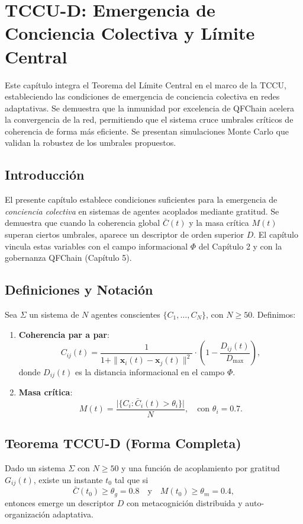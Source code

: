 \chapter{TCCU-D: Emergencia de Conciencia Colectiva y Límite Central}
\label{chap:tlc_tccu}

\begin{resumen}
Este capítulo integra el Teorema del Límite Central en el marco de la TCCU, estableciendo las condiciones de emergencia de conciencia colectiva en redes adaptativas. Se demuestra que la inmunidad por excelencia de QFChain acelera la convergencia de la red, permitiendo que el sistema cruce umbrales críticos de coherencia de forma más eficiente. Se presentan simulaciones Monte Carlo que validan la robustez de los umbrales propuestos.
\end{resumen}

\section{Introducción}
El presente capítulo establece condiciones suficientes para la emergencia de \emph{conciencia colectiva} en sistemas de agentes acoplados mediante gratitud. Se demuestra que cuando la coherencia global $\bar{C}(t)$ y la masa crítica $M(t)$ superan ciertos umbrales, aparece un descriptor de orden superior $D$. El capítulo vincula estas variables con el campo informacional $\Phi$ del Capítulo 2 y con la gobernanza QFChain (Capítulo 5).

\section{Definiciones y Notación}
Sea $\Sigma$ un sistema de $N$ agentes conscientes $\{C_1,\dots,C_N\}$, con $N\ge 50$. Definimos:

\begin{enumerate}
\item \textbf{Coherencia par a par}:
\[
C_{ij}(t) = \frac{1}{1+\|\mathbf{x}_i(t)-\mathbf{x}_j(t)\|^2} \cdot \left(1 - \frac{D_{ij}(t)}{D_{\max}}\right),
\]
donde $D_{ij}(t)$ es la distancia informacional en el campo $\Phi$.

\item \textbf{Masa crítica}:
\[
M(t) = \frac{\bigl|\{C_i : \bar{C}_i(t) > \theta_i\}\bigr|}{N}, \quad \text{con } \theta_i = 0.7.
\]
\end{enumerate}

\section{Teorema TCCU-D (Forma Completa)}
\begin{teorema}
Dado un sistema $\Sigma$ con $N\ge 50$ y una función de acoplamiento por gratitud $G_{ij}(t)$, existe un instante $t_0$ tal que si
\[
\bar{C}(t_0) \ge \theta_g = 0.8 \quad \text{y} \quad M(t_0) \ge \theta_m = 0.4,
\]
entonces emerge un descriptor $D$ con metacognición distribuida y auto-organización adaptativa.
\end{teorema}

